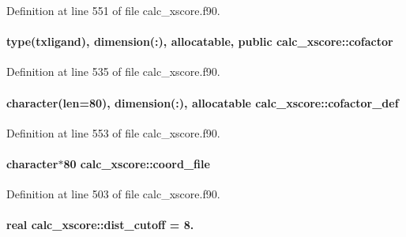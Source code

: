 Definition at line 551 of file calc\-\_\-xscore.\-f90.

\hypertarget{classcalc__xscore_a9ec517980814024a26fcabd005ab66c2}{
\paragraph[{cofactor}]{\setlength{\rightskip}{0pt plus 5cm}type({\bf txligand}), dimension(\-:), allocatable, public calc\-\_\-xscore\-::cofactor}}\label{classcalc__xscore_a9ec517980814024a26fcabd005ab66c2}


Definition at line 535 of file calc\-\_\-xscore.\-f90.

\hypertarget{classcalc__xscore_ac0ad4aa0cc1ff5cdcbb241d2349ffcfb}{
\paragraph[{cofactor\-\_\-def}]{\setlength{\rightskip}{0pt plus 5cm}character(len=80), dimension(\-:), allocatable calc\-\_\-xscore\-::cofactor\-\_\-def}}\label{classcalc__xscore_ac0ad4aa0cc1ff5cdcbb241d2349ffcfb}


Definition at line 553 of file calc\-\_\-xscore.\-f90.

\hypertarget{classcalc__xscore_a2166cde8bb47c9165d2c458a305b585b}{
\paragraph[{coord\-\_\-file}]{\setlength{\rightskip}{0pt plus 5cm}character$\ast$80 calc\-\_\-xscore\-::coord\-\_\-file}}\label{classcalc__xscore_a2166cde8bb47c9165d2c458a305b585b}


Definition at line 503 of file calc\-\_\-xscore.\-f90.

\hypertarget{classcalc__xscore_a93430b9e9b8412c72c0c348f44b0ad99}{
\paragraph[{dist\-\_\-cutoff}]{\setlength{\rightskip}{0pt plus 5cm}real calc\-\_\-xscore\-::dist\-\_\-cutoff = 8.}}\label{classcalc__xscore_a93430b9e9b8412c72c0c348f44b0ad99}


